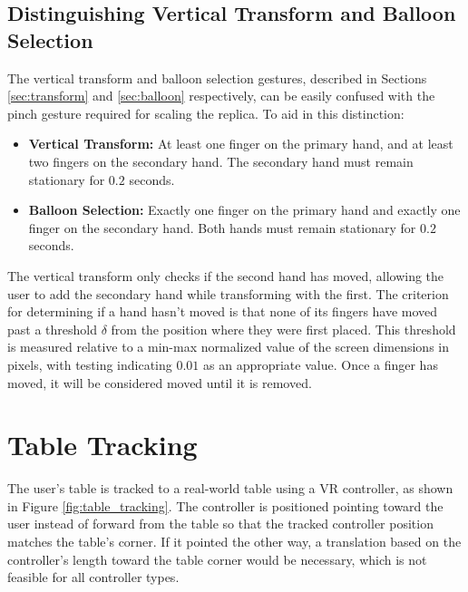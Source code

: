     \subsection{Distinguishing Vertical Transform and Balloon Selection} \label{sec:vertical_balloon}
    
        The vertical transform and balloon selection gestures, described in Sections \ref{sec:transform} and \ref{sec:balloon} respectively, can be easily confused with the pinch gesture required for scaling the replica. To aid in this distinction:
    
        \begin{itemize}
            \item \textbf{Vertical Transform:} At least one finger on the primary hand, and at least two fingers on the secondary hand. The secondary hand must remain stationary for $0.2$ seconds.
            \item \textbf{Balloon Selection:} Exactly one finger on the primary hand and exactly one finger on the secondary hand. Both hands must remain stationary for $0.2$ seconds.
        \end{itemize}
    
        The vertical transform only checks if the second hand has moved, allowing the user to add the secondary hand while transforming with the first. The criterion for determining if a hand hasn't moved is that none of its fingers have moved past a threshold $\delta$ from the position where they were first placed. This threshold is measured relative to a min-max normalized value of the screen dimensions in pixels, with testing indicating $0.01$ as an appropriate value. Once a finger has moved, it will be considered moved until it is removed.

\section{Table Tracking}

    The user's table is tracked to a real-world table using a VR controller, as shown in Figure \ref{fig:table_tracking}. The controller is positioned pointing toward the user instead of forward from the table so that the tracked controller position matches the table's corner. If it pointed the other way, a translation based on the controller's length toward the table corner would be necessary, which is not feasible for all controller types.

